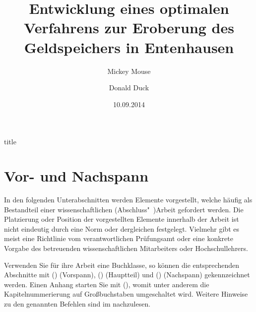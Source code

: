 \documentclass[%
  english,ngerman,%
  cdgeometry=no,DIV=12,automark%
]{tudscrartcl}
\begin{document}
\begin{Trunk!}{title}
\title{%
  Entwicklung eines optimalen Verfahrens zur Eroberung des
  Geldspeichers in Entenhausen
}
\author{%
  Mickey Mouse%
\and%
  Donald Duck%
}
\date{10.09.2014}
\makecover
\maketitle

\end{Trunk!}



\section{Vor- und Nachspann}
In den folgenden Unterabschnitten werden Elemente vorgestellt, welche häufig 
als Bestandteil einer wissenschaftlichen (Abschluss"~)Arbeit gefordert werden. 
Die Platzierung oder Position der vorgestellten Elemente innerhalb der Arbeit 
ist nicht eindeutig durch eine Norm oder dergleichen festgelegt. Vielmehr gibt 
es meist eine Richtlinie vom verantwortlichen Prüfungsamt oder eine konkrete 
Vorgabe des betreuenden wissenschaftlichen Mitarbeiters oder Hochschullehrers.

Verwenden Sie für ihre Arbeit eine Buchklasse, so können die entsprechenden 
Abschnitte mit () (Vorspann), 
() (Hauptteil) und 
() (Nachspann) gekennzeichnet werden. 
Einen Anhang starten Sie mit (), womit 
unter anderem die Kapitelnummerierung auf Großbuchstaben umgeschaltet wird. 
Weitere Hinweise zu den genannten Befehlen sind im \scrguide nachzulesen.
\end{document}
